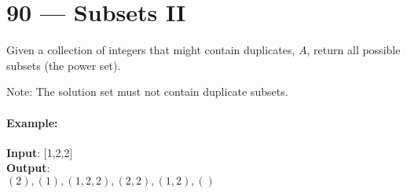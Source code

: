 \section{90 --- Subsets II}
Given a collection of integers that might contain duplicates, $A$, return all possible subsets (the power set).
\par
Note: The solution set must not contain duplicate subsets.
\paragraph{Example:}
\begin{flushleft}
\textbf{Input}: [1,2,2]
\\
\textbf{Output}:
\\
$(2),(1),(1,2,2),(2,2), (1,2), ()$
\end{flushleft}